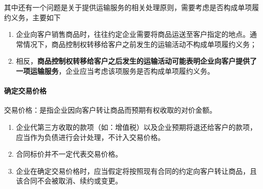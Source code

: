 \documentclass[UTF8,12pt]{ctexart}
\numberwithin{equation}{section} %
\numberwithin{figure}{section}
\numberwithin{table}{section}
\begin{document}
	其中还有一个问题是关于提供运输服务的相关处理原则，需要考虑是否构成单项履约义务，主要如下
	\begin{enumerate}
		\item 企业向客户销售商品时，往往约定企业需要将商品运送至客户指定的地点。通常情况下，商品控制权转移给客户之前发生的运输活动不构成单项履约义务；
		
		\item 相反，\textbf{商品控制权转移给客户之后发生的运输活动可能表明企业向客户提供了一项运输服务}，企业应当考虑该项服务是否构成单项履约义务。
	\end{enumerate}
	
	\paragraph{确定交易价格}
	交易价格：是指企业因向客户转让商品而预期有权收取的对价金额。
	\begin{enumerate}
		\item 企业代第三方收取的款项（如：增值税）以及企业预期将退还给客户的款项，应当作为负债进行会计处理，不计入交易价格。
		
		\item 合同标价并不一定代表交易价格。
		
		\item 企业在确定交易价格时，应当假定将按照现有合同的约定向客户转让商品，且该合同不会被取消、续约或变更。
	\end{enumerate}
	
\end{document}
